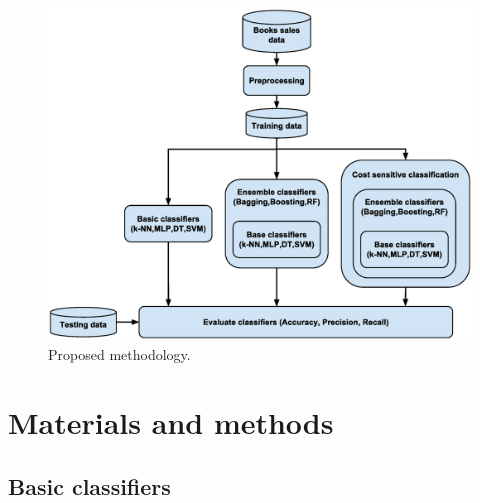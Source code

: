 \documentclass[a4paper,10pt,onecolumn,preprint,3p]{elsarticle}
\begin{document}
\begin{figure}[ht]
\begin{center}
\includegraphics[scale=0.40]{books_methodology}
\end{center}
\caption{Proposed methodology.}
\label{fig:methodology}
\end{figure}

\section{Materials and methods}
\label{sec:materials}


\subsection{Basic classifiers}
\label{subsec:classifiers}
\end{document}
